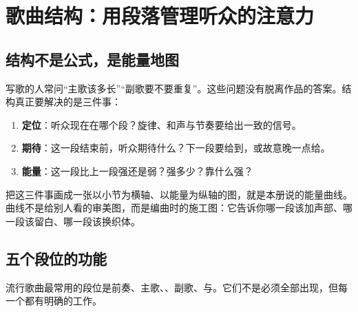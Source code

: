 \chapter{歌曲结构：用段落管理听众的注意力}
\label{ch:structure}


\section{结构不是公式，是能量地图}
\label{sec:structure-map}

写歌的人常问“主歌该多长”“副歌要不要重复”。这些问题没有脱离作品的答案。结构真正要解决的是三件事：

\begin{enumerate}
\item \textbf{定位}：听众现在在哪个段？旋律、和声与节奏要给出一致的信号。
\item \textbf{期待}：这一段结束前，听众期待什么？下一段要给到，或故意晚一点给。
\item \textbf{能量}：这一段比上一段强还是弱？强多少？靠什么强？
\end{enumerate}

把这三件事画成一张以小节为横轴、以能量为纵轴的图，就是本册说的能量曲线。曲线不是给别人看的审美图，而是编曲时的施工图：它告诉你哪一段该加声部、哪一段该留白、哪一段该换织体。

\section{五个段位的功能}
\label{sec:section-functions}

流行歌曲最常用的段位是前奏、主歌、、副歌、与。它们不是必须全部出现，但每一个都有明确的工作。

